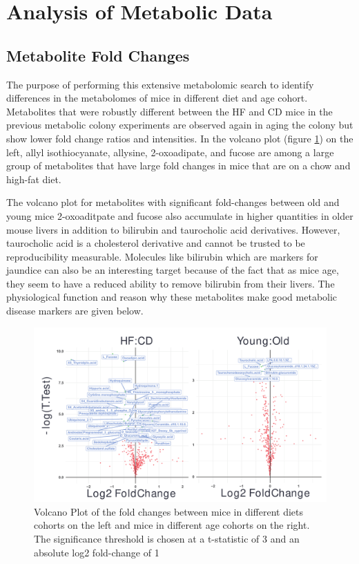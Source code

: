 \documentclass[a4paper,11pt,twoside]{book}
\begin{document}
	
	\section{Analysis of Metabolic Data}
	
	\subsection{Metabolite Fold Changes}
	
    The purpose of performing this extensive metabolomic search to identify differences in the metabolomes of mice in different diet and age cohort. Metabolites that were robustly different between the HF and CD mice in the previous metabolic colony experiments are observed again in aging the colony but show lower fold change ratios and intensities. In the volcano plot (figure \ref{volcano: Meatbolite Fold Changes}) on the left, allyl isothiocyanate, allysine, 2-oxoadipate, and fucose are among a large group of metabolites that have large fold changes in mice that are on a chow and high-fat diet. 

	The volcano plot for metabolites with significant fold-changes between old and young mice 2-oxoaditpate and fucose also accumulate in higher quantities in older mouse livers in addition to bilirubin and taurocholic acid derivatives. However, taurocholic acid is a cholesterol derivative and cannot be trusted to be reproducibility measurable. Molecules like bilirubin which are markers for jaundice can also be an interesting target because of the fact that as mice age, they seem to have a reduced ability to remove bilirubin from their livers. The physiological function and reason why these metabolites make good metabolic disease markers are given below.
		
	\begin{figure}[t!]
		\centering
		\includegraphics[width=\linewidth]{3.Metabolomics/Volcano}
		\caption{Volcano Plot of the fold changes between mice in different diets cohorts on the left and mice in different age cohorts on the right. The significance threshold is chosen at a t-statistic of 3 and an absolute log2 fold-change of 1}
		\label{volcano: Meatbolite Fold Changes}
	\end{figure}
	
\end{document}
